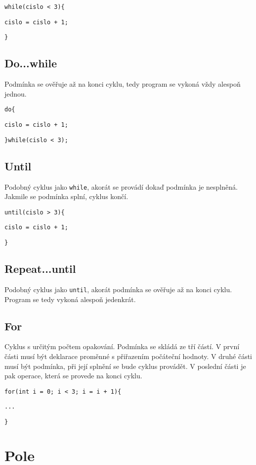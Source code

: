 \documentclass[czech]{thesiskiv}
\begin{document}

\texttt{while(cislo < 3)\{}

\texttt{cislo = cislo + 1;}

\texttt{\}}

\subsection{Do...while}
Podmínka se ověřuje až na konci cyklu, tedy program se vykoná vždy alespoň jednou.


\texttt{do\{}

\texttt{cislo = cislo + 1;}

\texttt{\}while(cislo < 3);}

\subsection{Until}
Podobný cyklus jako \texttt{while}, akorát se provádí dokaď podmínka je nesplněná.
Jakmile se podmínka splní, cyklus končí.


\texttt{until(cislo > 3)\{}

\texttt{cislo = cislo + 1;}

\texttt{\}}

\subsection{Repeat...until}
Podobný cyklus jako \texttt{until}, akorát podmínka se ověřuje až na konci cyklu.
Program se tedy vykoná alespoň jedenkrát.

\subsection{For}
Cyklus s určitým počtem opakování. Podmínka se skládá ze tří částí.
V první části musí být deklarace proměnné s přiřazením počáteční hodnoty.
V druhé části musí být podmínka, při její splnění se bude cyklus provádět.
V poslední části je pak operace, která se provede na konci cyklu.


\texttt{for(int i = 0; i < 3; i = i + 1)\{} 

\texttt{...}

\texttt{\}}
               
\section{Pole}
\end{document}
